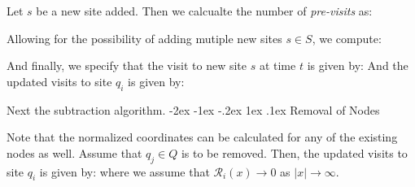 \documentclass[onecolumn, compsoc,10pt]{IEEEtran}
\makeatletter
\renewcommand\section{\@startsection {section}{1}{\z@}%
  {-2ex \@plus -1ex \@minus -.2ex}%
  {1ex \@plus.1ex}%
  {\LARGE\bfseries\scshape}}
\makeatother
\begin{document}
Let $s$ be a new site added. Then we calcualte the number of \textit{pre-visits} as:

Allowing for the possibility of adding mutiple new sites $s \in S$, we compute:

And finally, we specify that  the visit to new site $s$ at time $t$ is given by:
And the updated  visits to site $q_i$ is given by:

Next the subtraction algorithm.
\section{Removal of Nodes}

Note that the normalized coordinates can be calculated for any of the existing nodes as well. Assume that $q_j \in Q$ is to be removed. Then, the updated visits to site $q_i$ is given by: 
where we assume that $\mathcal{R}_i(x) \rightarrow 0$ as $\vert x \vert  \rightarrow \infty$.
\end{document}

